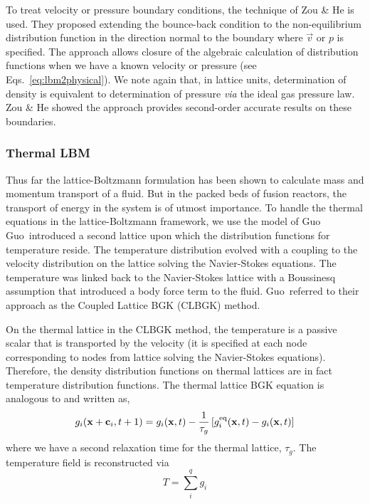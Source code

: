 To treat velocity or pressure boundary conditions, the technique of Zou \& He is used.\cite{Zou1997} They proposed extending the bounce-back condition to the non-equilibrium distribution function in the direction normal to the boundary where $\vec{v}$ or $p$ is specified. The approach allows closure of the algebraic calculation of distribution functions when we have a known velocity or pressure (see Eqs.~\ref{eq:lbm2physical}). We note again that, in lattice units, determination of density is equivalent to determination of pressure \textit{via} the ideal gas pressure law. Zou \& He showed the approach provides second-order accurate results on these boundaries.\cite{Zou1997} 












\subsubsection{Thermal LBM}

Thus far the lattice-Boltzmann formulation has been shown to calculate mass and momentum transport of a fluid. But in the packed beds of fusion reactors, the transport of energy in the system is of utmost importance. To handle the thermal equations in the lattice-Boltzmann framework, we use the model of Guo\etal\cite{Guo2002} Guo\etal~introduced a second lattice upon which the distribution functions for temperature reside. The temperature distribution evolved with a coupling to the velocity distribution on the lattice solving the Navier-Stokes equations. The temperature was linked back to the Navier-Stokes lattice with a Boussinesq assumption that introduced a body force term to the fluid.\cite{Guo2002} Guo\etal~referred to their approach as the Coupled Lattice BGK (CLBGK) method. 

On the thermal lattice in the CLBGK method, the temperature is a passive scalar that is transported by the velocity (it is specified at each node corresponding to nodes from lattice solving the Navier-Stokes equations). Therefore, the density distribution functions on thermal lattices are in fact temperature distribution functions. The thermal lattice BGK equation is analogous to  and written as,
\begin{equation}\label{eq:lbm-thermal-bgk}
	g_i(\mathbf{x}+\mathbf{c}_i, t + 1) = g_i(\mathbf{x},t) - \frac{1}{\tau_g}\left[g_i^{\text{eq}}(\mathbf{x},t) - g_i(\mathbf{x},t)\right]
\end{equation}
where we have a second relaxation time for the thermal lattice, $\tau_g$. The temperature field is reconstructed via
\begin{equation}
	T = \sum_i^q g_i
\end{equation}

